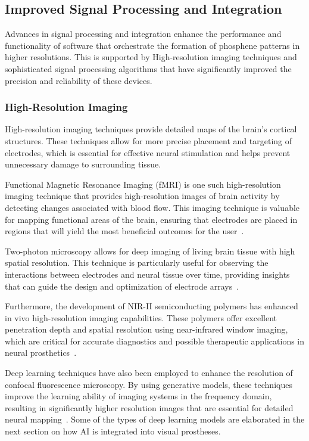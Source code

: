 \documentclass[twocolumn,10pt]{article}
\begin{document}
\subsection*{Improved Signal Processing and Integration}
Advances in signal processing and integration enhance the performance and
functionality of software that orchestrate the formation of phosphene patterns
in higher resolutions. This is supported by High-resolution imaging techniques
and sophisticated signal processing algorithms that have significantly improved
the precision and reliability of these devices.

\subsubsection*{High-Resolution Imaging}
High-resolution imaging techniques provide detailed maps of the brain's cortical
structures. These techniques allow for more precise placement and targeting of
electrodes, which is essential for effective neural stimulation and helps
prevent unnecessary damage to surrounding tissue.

Functional Magnetic Resonance Imaging (fMRI) is one such high-resolution imaging
technique that provides high-resolution images of
brain activity by detecting changes associated with blood flow. This imaging
technique is valuable for mapping functional areas of the brain, ensuring that
electrodes are placed in regions that will yield the most beneficial outcomes
for the user~\parencite{landelleInvestigatingHumanSpinal2021}.

Two-photon microscopy allows for deep imaging of living brain tissue with high
spatial resolution. This technique is particularly useful for observing the
interactions between electrodes and neural tissue over time, providing insights
that can guide the design and optimization of electrode
arrays~\parencite{yangIntegratedMicroprismMicroelectrode2024}.

Furthermore, the development of NIR-II semiconducting polymers has enhanced in
vivo high-resolution imaging capabilities. These polymers offer excellent
penetration depth and spatial resolution using near-infrared window imaging,
which are critical for accurate diagnostics and possible therapeutic
applications in neural
prosthetics~\parencite{wangRecentProgressSecond2023,kangNIRIISemiconductingPolymers2023}.

Deep learning techniques have also been employed to enhance the resolution of
confocal fluorescence microscopy. By using generative models, these techniques
improve the learning ability of imaging systems in the frequency domain,
resulting in significantly higher resolution images that are essential for
detailed neural mapping~\parencite{huangEnhancingImageResolution2023}. Some of
the types of deep learning models are elaborated in the next section on how AI
is integrated into visual prostheses.
\end{document}
